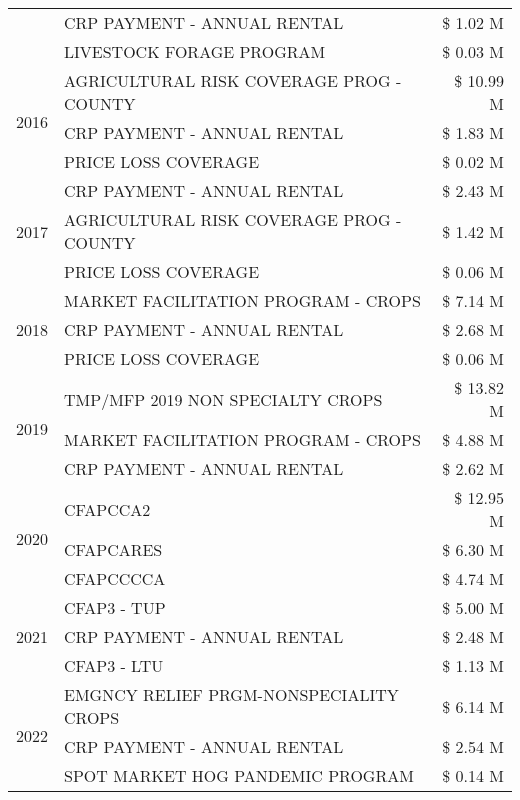 \begin{tabular}{llr}
 & CRP PAYMENT - ANNUAL RENTAL & \$ 1.02 M \\
 & LIVESTOCK FORAGE PROGRAM & \$ 0.03 M \\
\cline{1-3}
\multirow[t]{3}{*}{2016} & AGRICULTURAL RISK COVERAGE PROG - COUNTY & \$ 10.99 M \\
 & CRP PAYMENT - ANNUAL RENTAL & \$ 1.83 M \\
 & PRICE LOSS COVERAGE & \$ 0.02 M \\
\cline{1-3}
\multirow[t]{3}{*}{2017} & CRP PAYMENT - ANNUAL RENTAL & \$ 2.43 M \\
 & AGRICULTURAL RISK COVERAGE PROG - COUNTY & \$ 1.42 M \\
 & PRICE LOSS COVERAGE & \$ 0.06 M \\
\cline{1-3}
\multirow[t]{3}{*}{2018} & MARKET FACILITATION PROGRAM - CROPS & \$ 7.14 M \\
 & CRP PAYMENT - ANNUAL RENTAL & \$ 2.68 M \\
 & PRICE LOSS COVERAGE & \$ 0.06 M \\
\cline{1-3}
\multirow[t]{3}{*}{2019} & TMP/MFP 2019 NON SPECIALTY CROPS & \$ 13.82 M \\
 & MARKET FACILITATION PROGRAM - CROPS & \$ 4.88 M \\
 & CRP PAYMENT - ANNUAL RENTAL & \$ 2.62 M \\
\cline{1-3}
\multirow[t]{3}{*}{2020} & CFAPCCA2 & \$ 12.95 M \\
 & CFAPCARES & \$ 6.30 M \\
 & CFAPCCCCA & \$ 4.74 M \\
\cline{1-3}
\multirow[t]{3}{*}{2021} & CFAP3 - TUP & \$ 5.00 M \\
 & CRP PAYMENT - ANNUAL RENTAL & \$ 2.48 M \\
 & CFAP3 - LTU & \$ 1.13 M \\
\cline{1-3}
\multirow[t]{3}{*}{2022} & EMGNCY RELIEF PRGM-NONSPECIALITY CROPS & \$ 6.14 M \\
 & CRP PAYMENT - ANNUAL RENTAL & \$ 2.54 M \\
 & SPOT MARKET HOG PANDEMIC PROGRAM & \$ 0.14 M \\
\cline{1-3}
\bottomrule
\end{tabular}
